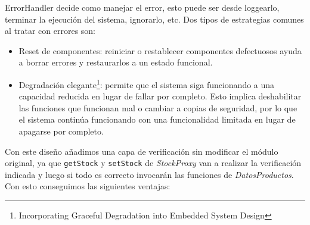 \begin{figure}[h]
\begin{center}
\end{center}
\end{figure}
ErrorHandler decide como manejar el error, esto puede ser desde loggearlo, terminar la ejecución del sistema, ignorarlo, etc. Dos tipos de estrategias comunes al tratar con errores son:
\begin{itemize}
    \item Reset de componentes: reiniciar o restablecer componentes defectuosos ayuda a borrar errores y restaurarlos a un estado funcional.
    \item Degradación elegante\footnote{Incorporating Graceful Degradation into Embedded System Design}: permite que el sistema siga funcionando a una capacidad reducida en lugar de fallar por completo. Esto implica deshabilitar las funciones que funcionan mal o cambiar a copias de seguridad, por lo que el sistema continúa funcionando con una funcionalidad limitada en lugar de apagarse por completo.
\end{itemize}


Con este diseño añadimos una capa de verificación sin modificar el módulo original, ya que \verb|getStock| y \verb|setStock| de \textit{StockProxy} van a realizar la verificación indicada y luego si todo es correcto invocarán las funciones de \textit{DatosProductos}. Con esto conseguimos las siguientes ventajas:

